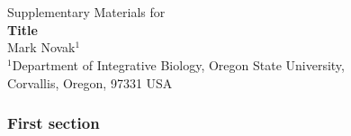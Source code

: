 \documentclass[11pt]{article}
\begin{document}
\clearpage

\nolinenumbers
\baselineskip12pt


\part{} %

		\begin{center}

			{\Large Supplementary Materials for}\\
			{\Large \bf Title}\\
			\vspace{0.2 in}
			{\large Mark Novak$^{1}$}\\
			\vspace{0.15 in}
				\small{$^1$Department of Integrative Biology, Oregon State 
				University,}\\
			\small{Corvallis, Oregon, 97331 USA}\\
			\vspace{0.15 in}
			
			\thispagestyle{empty}
	
		\end{center}
		

\parttoc %

\clearpage

\setcounter{page}{1}
\setcounter{figure}{0}
\setcounter{table}{0}
\setcounter{equation}{0}

\renewcommand{\thepage}{S\arabic{page}}
\renewcommand{\thefigure}{S.\arabic{figure}}
\renewcommand{\thetable}{S.\arabic{table}}
\renewcommand{\theequation}{S.\arabic{equation}}



\section{First section}


\end{document}
